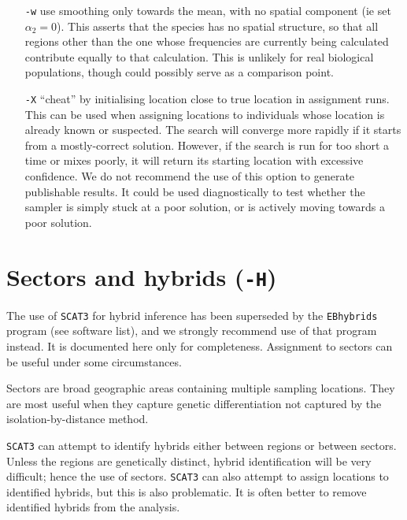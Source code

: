 \documentclass[10pt,titlepage,times,letterpaper]{article}
\def\SCAT{{\tt SCAT3} }
\begin{document}
\begin{itemize}
\item[{\tt -w}] use smoothing only towards the mean, with no spatial component (ie set
$\alpha_2 = 0$).  This asserts that the species has no spatial 
structure, so that all regions other than the one whose frequencies are
currently being calculated contribute equally to that calculation.  This is
unlikely for real biological populations, though could possibly serve as
a comparison point.

\item[{\tt -X}] ``cheat'' by initialising location close to true location in assignment runs.  
This can be used when assigning locations to 
individuals whose location is already known or suspected.  The search will
converge more rapidly if it starts from a mostly-correct solution.
However, if the search is run for too short a time or mixes poorly, it will
return its starting location with excessive confidence.  We do not recommend
the use of this option to generate publishable results.
It could be used diagnostically to
test whether the sampler is simply stuck at a poor solution, or is actively
moving towards a poor solution.
\end{itemize}







\section{Sectors and hybrids ({\tt -H})}

The use of \SCAT for hybrid inference
has been superseded by the {\tt EBhybrids}
program (see software list), and we strongly recommend use of that 
program instead.  It is documented here only for completeness. 
Assignment to sectors can be useful under some circumstances.

Sectors are broad geographic areas containing multiple sampling
locations.  They are most useful when they capture genetic differentiation
not captured by the isolation-by-distance method.

\SCAT can attempt to identify hybrids either between regions or
between sectors.  Unless the regions are genetically
distinct, hybrid identification will be very difficult; hence the
use of sectors.  \SCAT can also attempt to assign locations to
identified hybrids, but this is also problematic.  It is often better
to remove identified hybrids from the analysis.
\end{document}
